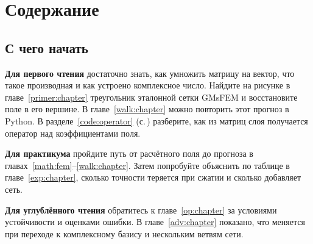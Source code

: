 \chapter*{Содержание}
\begingroup
\makeatletter{}\makeatother
\endgroup

\vspace{1.1em}
\section*{С чего начать}
\textbf{Для первого чтения} достаточно знать, как умножить матрицу на вектор,
что такое производная и как устроено комплексное число. Найдите на рисунке в главе~\ref{primer:chapter} треугольник
эталонной сетки GMsFEM и восстановите поле в его вершине.
В главе~\ref{walk:chapter} можно повторить этот прогноз в Python.
В разделе~\ref{code:operator} (с.\,\pageref{code:operator}) разберите, как
из матриц слоя получается оператор над коэффициентами поля.

\textbf{Для практикума} пройдите путь от расчётного поля до прогноза
в главах~\ref{math:fem}--\ref{walk:chapter}. Затем попробуйте объяснить
по таблице в главе~\ref{exp:chapter}, сколько точности теряется при сжатии
и сколько добавляет сеть.

\textbf{Для углублённого чтения} обратитесь к главе~\ref{op:chapter}
за условиями устойчивости и оценками ошибки. В главе~\ref{adv:chapter}
показано, что меняется при переходе к комплексному базису и нескольким ветвям сети.
